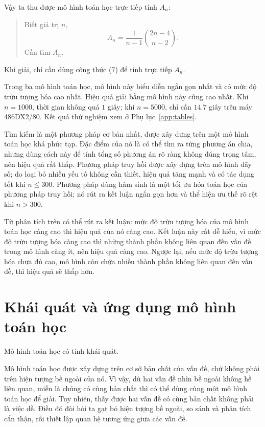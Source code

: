 \documentclass[11pt]{article}
\begin{document}
Vậy ta thu được mô hình toán học trực tiếp tính \(A_n\):
\begin{quote}
Biết giá trị \(n\),
\[
  A_n=\frac{1}{n-1}\binom{2n-4}{n-2}. \tag{7}
\]
Cần tìm \(A_n\).
\end{quote}

Khi giải, chỉ cần dùng công thức (7) để tính trực tiếp \(A_n\).

Trong ba mô hình toán học, mô hình này biểu diễn ngắn gọn nhất và có mức độ
trừu tượng hóa cao nhất. Hiệu quả giải bằng mô hình này cũng cao nhất. Khi
\(n=1000\), thời gian không quá \(1\) giây; khi \(n=5000\), chỉ cần \(14.7\)
giây trên máy 486DX2/80. Kết quả thử nghiệm xem ở Phụ lục~\ref{app:tables}.

Tìm kiếm là một phương pháp cơ bản nhất, được xây dựng trên một mô hình toán
học khá phức tạp. Đặc điểm của nó là có thể tìm ra từng phương án chia, nhưng
dùng cách này để tính tổng số phương án rõ ràng không đúng trọng tâm, nên
hiệu quả rất thấp. Phương pháp truy hồi được xây dựng trên mô hình dãy số; do
loại bỏ nhiều yếu tố không cần thiết, hiệu quả tăng mạnh và có tác dụng tốt
khi \(n\le 300\). Phương pháp dùng hàm sinh là một tối ưu hóa toán học của
phương pháp truy hồi; nó rút ra kết luận ngắn gọn hơn và thể hiện ưu thế rõ
rệt khi \(n>300\).

Từ phân tích trên có thể rút ra kết luận: mức độ trừu tượng hóa của mô hình
toán học càng cao thì hiệu quả của nó càng cao. Kết luận này rất dễ hiểu, vì
mức độ trừu tượng hóa càng cao thì những thành phần không liên quan đến vấn
đề trong mô hình càng ít, nên hiệu quả càng cao. Ngược lại, nếu mức độ trừu
tượng hóa chưa đủ cao, mô hình còn chứa nhiều thành phần không liên quan đến
vấn đề, thì hiệu quả sẽ thấp hơn.

\section{Khái quát và ứng dụng mô hình toán học}

Mô hình toán học có tính khái quát.

Mô hình toán học được xây dựng trên cơ sở bản chất của vấn đề, chứ không phải
trên hiện tượng bề ngoài của nó. Vì vậy, dù hai vấn đề nhìn bề ngoài không hề
liên quan, miễn là chúng có cùng bản chất thì có thể dùng cùng một mô hình
toán học để giải. Tuy nhiên, thấy được hai vấn đề có cùng bản chất không phải
là việc dễ. Điều đó đòi hỏi ta gạt bỏ hiện tượng bề ngoài, so sánh và phân
tích cẩn thận, rồi thiết lập quan hệ tương ứng giữa các vấn đề.
\end{document}
